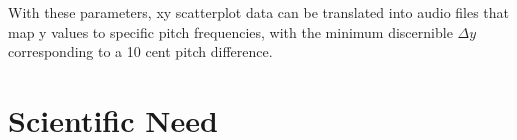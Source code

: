 \documentclass[]{acmsiggraph}
\begin{document}
With these parameters, xy scatterplot data can be translated into audio files that map y values to specific pitch frequencies, with the minimum discernible $\Delta y$ corresponding to a 10 cent pitch difference.






\section{Scientific Need}
\end{document}
